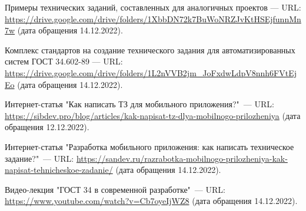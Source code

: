 \documentclass[14pt]{extreport}
\begin{document}
\newpage
\begin{thebibliography}{99}

Примеры технических заданий, составленных для аналогичных проектов — URL: \url{https://drive.google.com/drive/folders/1XbbDN72k7BuWoNRZJvKtHSEjfunnMn7w} (дата обращения 14.12.2022).

Комплекс стандартов на создание технического задания для автоматизированных систем ГОСТ 34.602-89 — URL: \url{https://drive.google.com/drive/folders/1L2nVVB2jm_JoFxdwLdpV8nnh6FVtEjEo} (дата обращения 14.12.2022).

Интернет-статья "Как написать ТЗ для мобильного приложения?"\ — URL: \url{https://sibdev.pro/blog/articles/kak-napisat-tz-dlya-mobilnogo-prilozheniya} (дата обращения 12.12.2022).

Интернет-статья "Разработка мобильного приложения: как написать техническое задание?"\ — URL: \url{https://sandev.ru/razrabotka-mobilnogo-prilozheniya-kak-napisat-tehnicheskoe-zadanie/} (дата обращения 14.12.2022).

Видео-лекция "ГОСТ 34 в современной разработке"\  — URL: \url{https://www.youtube.com/watch?v=Cb7oyeIjWZ8} (дата обращения 14.12.2022).
	
\end{thebibliography}
\end{document}
